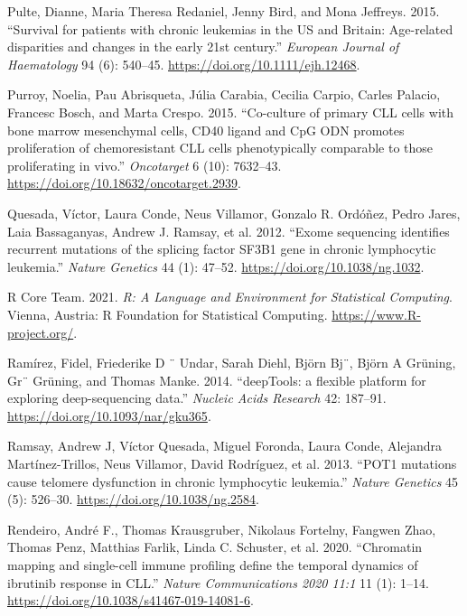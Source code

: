 \documentclass[11pt, a4paper, twosided]{book}
\newenvironment{CSLReferences}%
  {}%
  {\par}
\begin{document}
\begin{CSLReferences}{1}{0}
\leavevmode{}%
Pulte, Dianne, Maria Theresa Redaniel, Jenny Bird, and Mona Jeffreys. 2015. {``{Survival for patients with chronic leukemias in the US and Britain: Age-related disparities and changes in the early 21st century.}''} \emph{European Journal of Haematology} 94 (6): 540--45. \url{https://doi.org/10.1111/ejh.12468}.

\leavevmode{}%
Purroy, Noelia, Pau Abrisqueta, Júlia Carabia, Cecilia Carpio, Carles Palacio, Francesc Bosch, and Marta Crespo. 2015. {``{Co-culture of primary CLL cells with bone marrow mesenchymal cells, CD40 ligand and CpG ODN promotes proliferation of chemoresistant CLL cells phenotypically comparable to those proliferating in vivo}.''} \emph{Oncotarget} 6 (10): 7632--43. \url{https://doi.org/10.18632/oncotarget.2939}.

\leavevmode{}%
Quesada, Víctor, Laura Conde, Neus Villamor, Gonzalo R. Ordóñez, Pedro Jares, Laia Bassaganyas, Andrew J. Ramsay, et al. 2012. {``{Exome sequencing identifies recurrent mutations of the splicing factor SF3B1 gene in chronic lymphocytic leukemia}.''} \emph{Nature Genetics} 44 (1): 47--52. \url{https://doi.org/10.1038/ng.1032}.

\leavevmode{}%
R Core Team. 2021. \emph{R: A Language and Environment for Statistical Computing}. Vienna, Austria: R Foundation for Statistical Computing. \url{https://www.R-project.org/}.

\leavevmode{}%
Ramírez, Fidel, Friederike D ¨ Undar, Sarah Diehl, Björn Bj¨, Björn A Grüning, Gr¨ Grüning, and Thomas Manke. 2014. {``{deepTools: a flexible platform for exploring deep-sequencing data}.''} \emph{Nucleic Acids Research} 42: 187--91. \url{https://doi.org/10.1093/nar/gku365}.

\leavevmode{}%
Ramsay, Andrew J, Víctor Quesada, Miguel Foronda, Laura Conde, Alejandra Martínez-Trillos, Neus Villamor, David Rodríguez, et al. 2013. {``{POT1 mutations cause telomere dysfunction in chronic lymphocytic leukemia}.''} \emph{Nature Genetics} 45 (5): 526--30. \url{https://doi.org/10.1038/ng.2584}.

\leavevmode{}%
Rendeiro, André F., Thomas Krausgruber, Nikolaus Fortelny, Fangwen Zhao, Thomas Penz, Matthias Farlik, Linda C. Schuster, et al. 2020. {``{Chromatin mapping and single-cell immune profiling define the temporal dynamics of ibrutinib response in CLL}.''} \emph{Nature Communications 2020 11:1} 11 (1): 1--14. \url{https://doi.org/10.1038/s41467-019-14081-6}.


\end{CSLReferences}
\end{document}

